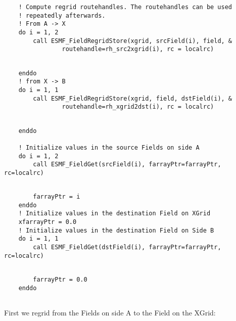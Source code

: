 
 \begin{verbatim}
    ! Compute regrid routehandles. The routehandles can be used
    ! repeatedly afterwards.
    ! From A -> X
    do i = 1, 2
        call ESMF_FieldRegridStore(xgrid, srcField(i), field, &
                routehandle=rh_src2xgrid(i), rc = localrc)
 
\end{verbatim}
 

 \begin{verbatim}
    enddo
    ! from X -> B
    do i = 1, 1
        call ESMF_FieldRegridStore(xgrid, field, dstField(i), &
                routehandle=rh_xgrid2dst(i), rc = localrc)
 
\end{verbatim}
 

 \begin{verbatim}
    enddo

    ! Initialize values in the source Fields on side A
    do i = 1, 2
        call ESMF_FieldGet(srcField(i), farrayPtr=farrayPtr, rc=localrc)
 
\end{verbatim}
 

 \begin{verbatim}
        farrayPtr = i
    enddo
    ! Initialize values in the destination Field on XGrid
    xfarrayPtr = 0.0
    ! Initialize values in the destination Field on Side B
    do i = 1, 1
        call ESMF_FieldGet(dstField(i), farrayPtr=farrayPtr, rc=localrc)
 
\end{verbatim}
 

 \begin{verbatim}
        farrayPtr = 0.0
    enddo
 
\end{verbatim}
 

   First we regrid from the Fields on side A to the Field on the XGrid: 

